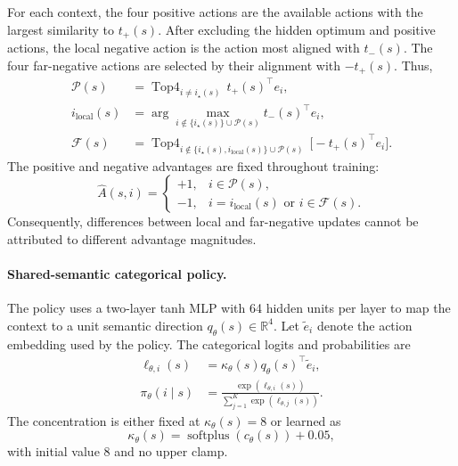 For each context, the four positive actions are the available actions
with the largest similarity to $t_+(s)$. After excluding the hidden
optimum and positive actions, the local negative action is the action
most aligned with $t_-(s)$. The four far-negative actions are selected
by their alignment with $-t_+(s)$. Thus,
\begin{equation}
\begin{aligned}
    \mathcal P(s)
    &=
    \operatorname{Top4}_{i\neq i_\star(s)}
    \,
    t_+(s)^\top e_i, \\
    i_{\mathrm{local}}(s)
    &=
    \arg\max_{i\notin
        \{i_\star(s)\}\cup\mathcal P(s)}
    t_-(s)^\top e_i, \\
    \mathcal F(s)
    &=
    \operatorname{Top4}_{i\notin
        \{i_\star(s),i_{\mathrm{local}}(s)\}
        \cup\mathcal P(s)}
    \,
    \bigl[-t_+(s)^\top e_i\bigr].
\end{aligned}
\label{eq:du1_action_roles}
\end{equation}
The positive and negative advantages are fixed throughout training:
\begin{equation}
    \widehat A(s,i)
    =
    \begin{cases}
        +1,
        & i\in\mathcal P(s),\\
        -1,
        & i=i_{\mathrm{local}}(s)
          \text{ or }i\in\mathcal F(s).
    \end{cases}
    \label{eq:du1_fixed_advantages}
\end{equation}
Consequently, differences between local and far-negative updates cannot
be attributed to different advantage magnitudes.

\paragraph{Shared-semantic categorical policy.}
The policy uses a two-layer tanh MLP with 64 hidden units per layer to
map the context to a unit semantic direction
$q_\theta(s)\in\mathbb R^4$.
Let $\widetilde e_i$ denote the action embedding used by the policy. The
categorical logits and probabilities are
\begin{equation}
\begin{aligned}
    \ell_{\theta,i}(s)
    &=
    \kappa_\theta(s)
    q_\theta(s)^\top
    \widetilde e_i, \\
    \pi_\theta(i\mid s)
    &=
    \frac{
        \exp\!\left(\ell_{\theta,i}(s)\right)
    }{
        \sum_{j=1}^{K}
        \exp\!\left(\ell_{\theta,j}(s)\right)
    }.
\end{aligned}
\label{eq:du1_policy}
\end{equation}
The concentration is either fixed at
$\kappa_\theta(s)=8$
or learned as
\begin{equation}
    \kappa_\theta(s)
    =
    \operatorname{softplus}
    \!\left(
        c_\theta(s)
    \right)
    +
    0.05,
    \label{eq:du1_concentration}
\end{equation}
with initial value 8 and no upper clamp.

